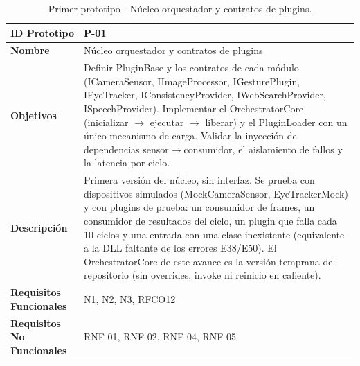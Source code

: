 \begin{table}[H]
\centering
\caption{Primer prototipo - Núcleo orquestador y contratos de plugins.}
\label{tab:prototipo-p01}
\small
\begin{tabularx}{\textwidth}{>{\bfseries}l X}
\toprule
ID Prototipo & P-01 \\ \midrule
Nombre & Núcleo orquestador y contratos de plugins \\ \midrule
Objetivos & Definir PluginBase y los contratos de cada módulo (ICameraSensor, IImageProcessor, IGesturePlugin, IEyeTracker, IConsistencyProvider, IWebSearchProvider, ISpeechProvider). \newline Implementar el OrchestratorCore (inicializar $\rightarrow$ ejecutar $\rightarrow$ liberar) y el PluginLoader con un único mecanismo de carga. \newline Validar la inyección de dependencias sensor$\rightarrow$consumidor, el aislamiento de fallos y la latencia por ciclo. \\ \midrule
Descripción & Primera versión del núcleo, sin interfaz. Se prueba con dispositivos simulados (MockCameraSensor, EyeTrackerMock) y con plugins de prueba: un consumidor de frames, un consumidor de resultados del ciclo, un plugin que falla cada 10 ciclos y una entrada con una clase inexistente (equivalente a la DLL faltante de los errores E38/E50). El OrchestratorCore de este avance es la versión temprana del repositorio (sin overrides, invoke ni reinicio en caliente). \\ \midrule
Requisitos Funcionales & N1, N2, N3, RFCO12 \\ \midrule
Requisitos No Funcionales & RNF-01, RNF-02, RNF-04, RNF-05 \\ \bottomrule
\end{tabularx}
\end{table}
